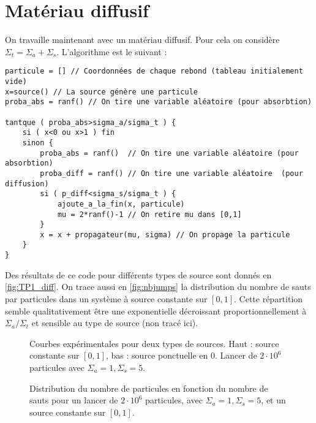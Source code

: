 \documentclass[11pt,a4paper]{article}
\begin{document}
\section{Matériau diffusif}

On travaille maintenant avec un matériau diffusif. Pour cela on considère $\Sigma_t = \Sigma_a + \Sigma_s$. L'algorithme est le suivant : 

\begin{verbatim}
particule = [] // Coordonnées de chaque rebond (tableau initialement vide) 
x=source() // La source génère une particule                                      
proba_abs = ranf() // On tire une variable aléatoire (pour absorbtion)

tantque ( proba_abs>sigma_a/sigma_t ) {
    si ( x<0 ou x>1 ) fin 
    sinon {
        proba_abs = ranf()  // On tire une variable aléatoire (pour absorbtion)
        proba_diff = ranf() // On tire une variable aléatoire  (pour diffusion)
        si ( p_diff<sigma_s/sigma_t ) {
            ajoute_a_la_fin(x, particule)
            mu = 2*ranf()-1 // On retire mu dans [0,1]
        }
        x = x + propagateur(mu, sigma) // On propage la particule
    }
}
\end{verbatim}

Des résultats de ce code pour différents types de source sont donnés en \autoref{fig:TP1_diff}. On trace aussi en \autoref{fig:nbjumps} la distribution du nombre de sauts par particules dans un système à source constante sur $[0,1]$. Cette répartition semble qualitativement être une exponentielle décroissant proportionnellement à $\Sigma_a/\Sigma_t$ et sensible au type de source (non tracé ici).
\begin{figure}
  \centering
  \caption{Courbes expérimentales pour deux types de sources. Haut : source constante sur $[0,1]$, bas : source ponctuelle en 0. Lancer de $2\cdot10^6$ particules avec $\Sigma_a = 1, \Sigma_s = 5$.}
  \label{fig:TP1_diff}
\end{figure}

\begin{figure}
  \centering
  \caption{Distribution du nombre de particules en fonction du nombre de sauts pour un lancer de $2\cdot10^6$ particules, avec $\Sigma_a = 1, \Sigma_s = 5$, et un source constante sur $[0,1]$.}
  \label{fig:nbjumps}
\end{figure}
\end{document}
